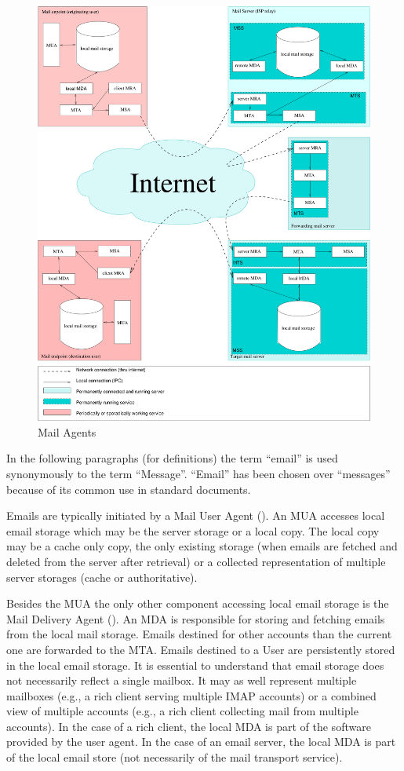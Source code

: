 \begin{figure}[ht!]
	\centering\includegraphics[width=\columnwidth]{inc/MailAgents1.pdf}
	\caption{Mail Agents}\label{fig:MailAgents}
\end{figure}

In the following paragraphs (for definitions) the term ``email'' is used synonymously to the term ``Message''.  ``Email'' has been chosen over ``messages'' because of its common use in standard documents.

Emails are typically initiated by a Mail User Agent (). An MUA accesses local email storage which may be the server storage or a local copy. The local copy may be a cache only copy, the only existing storage (when emails are fetched and deleted from the server after retrieval) or a collected representation of multiple server storages (cache or authoritative).

Besides the MUA the only other component accessing local email storage is the Mail Delivery Agent (). An MDA is responsible for storing and fetching emails from the local mail storage. Emails destined for other accounts than the current one are forwarded to the MTA. Emails destined to a User are persistently stored in the local email storage. It is essential to understand that email storage does not necessarily reflect a single mailbox. It may as well represent multiple mailboxes (e.g., a rich client serving multiple IMAP accounts) or a combined view of multiple accounts (e.g., a rich client collecting mail from multiple  accounts). In the case of a rich client, the local MDA is part of the software provided by the user agent. In the case of an email server, the local MDA is part of the local email store (not necessarily of the mail transport service).

